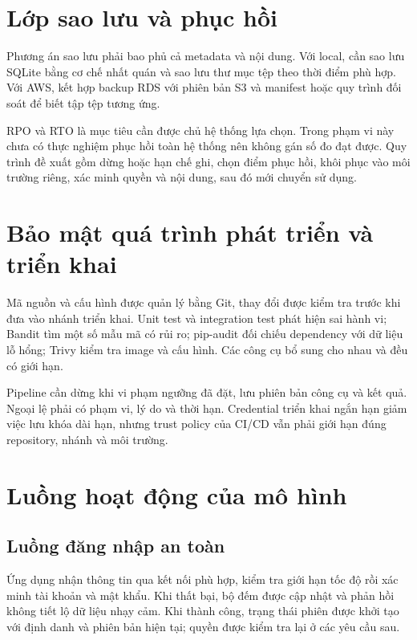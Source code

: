 \section{Lớp sao lưu và phục hồi}
Phương án sao lưu phải bao phủ cả metadata và nội dung. Với local, cần sao lưu SQLite bằng cơ chế nhất quán và sao lưu thư mục tệp theo thời điểm phù hợp. Với AWS, kết hợp backup RDS với phiên bản S3 và manifest hoặc quy trình đối soát để biết tập tệp tương ứng.

RPO và RTO là mục tiêu cần được chủ hệ thống lựa chọn. Trong phạm vi này chưa có thực nghiệm phục hồi toàn hệ thống nên không gán số đo đạt được. Quy trình đề xuất gồm dừng hoặc hạn chế ghi, chọn điểm phục hồi, khôi phục vào môi trường riêng, xác minh quyền và nội dung, sau đó mới chuyển sử dụng.

\section{Bảo mật quá trình phát triển và triển khai}
Mã nguồn và cấu hình được quản lý bằng Git, thay đổi được kiểm tra trước khi đưa vào nhánh triển khai. Unit test và integration test phát hiện sai hành vi; Bandit tìm một số mẫu mã có rủi ro; pip-audit đối chiếu dependency với dữ liệu lỗ hổng; Trivy kiểm tra image và cấu hình. Các công cụ bổ sung cho nhau và đều có giới hạn.

Pipeline cần dừng khi vi phạm ngưỡng đã đặt, lưu phiên bản công cụ và kết quả. Ngoại lệ phải có phạm vi, lý do và thời hạn. Credential triển khai ngắn hạn giảm việc lưu khóa dài hạn, nhưng trust policy của CI/CD vẫn phải giới hạn đúng repository, nhánh và môi trường.

\section{Luồng hoạt động của mô hình}
\subsection{Luồng đăng nhập an toàn}
Ứng dụng nhận thông tin qua kết nối phù hợp, kiểm tra giới hạn tốc độ rồi xác minh tài khoản và mật khẩu. Khi thất bại, bộ đếm được cập nhật và phản hồi không tiết lộ dữ liệu nhạy cảm. Khi thành công, trạng thái phiên được khởi tạo với định danh và phiên bản hiện tại; quyền được kiểm tra lại ở các yêu cầu sau.
